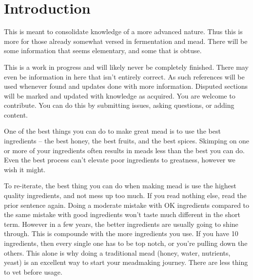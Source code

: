 \section{Introduction}
 This is meant to consolidate knowledge of a more advanced nature. Thus this is more for those already somewhat 
 versed in fermentation and mead. There will be some information that seems elementary, and some that is obtuse.

 This is a work in progress and will likely never be completely finished. There may even be information in
 here that isn't entirely correct. As such references will be used whenever found and updates done with more 
 information. Disputed sections will be marked and updated with knowledge as acquired. You are welcome to 
 contribute. You can do this by submitting issues, asking questions, or adding content.

 One of the best things you can do to make great mead is to use the best ingredients -- the best honey, the best 
 fruits, and the best spices. Skimping on one or more of your ingredients often results in meads less than the 
 best you can do. Even the best process can't elevate poor ingredients to greatness, however we wish it might.

 To re-iterate, the best thing you can do when making mead is use the highest quality ingredients, and not mess
 up too much. If you read nothing else, read the prior sentence again. Doing a moderate mistake with OK ingredients
 compared to the same mistake with good ingredients won't taste much different in the short term. However in a few
 years, the better ingredients are usually going to shine through. This is compounde with the more ingredients you
 use. If you have 10 ingredients, then every single one has to be top notch, or you're pulling down the others.
 This alone is why doing a traditional mead (honey, water, nutrients, yeast) is an excellent way to start your
 meadmaking journey. There are less thing to vet before usage.

